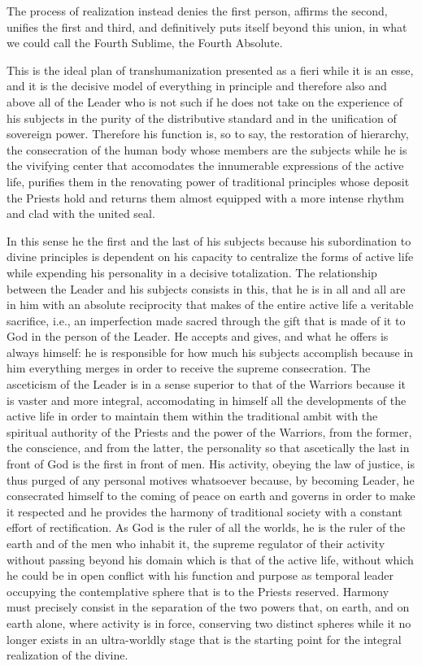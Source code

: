 The process of realization instead denies the first person, affirms the second, unifies the first and third, and definitively puts itself beyond this union, in what we could call the Fourth Sublime, the Fourth Absolute.

This is the ideal plan of transhumanization presented as a fieri while it is an esse, and it is the decisive model of everything in principle and therefore also and above all of the Leader who is not such if he does not take on the experience of his subjects in the purity of the distributive standard and in the unification of sovereign power. Therefore his function is, so to say, the restoration of hierarchy, the consecration of the human body whose members are the subjects while he is the vivifying center that accomodates the innumerable expressions of the active life, purifies them in the renovating power of traditional principles whose deposit the Priests hold and returns them almost equipped with a more intense rhythm and clad with the united seal.

In this sense he the first and the last of his subjects because his subordination to divine principles is dependent on his capacity to centralize the forms of active life while expending his personality in a decisive totalization. The relationship between the Leader and his subjects consists in this, that he is in all and all are in him with an absolute reciprocity that makes of the entire active life a veritable sacrifice, i.e., an imperfection made sacred through the gift that is made of it to God in the person of the Leader. He accepts and gives, and what he offers is always himself: he is responsible for how much his subjects accomplish because in him everything merges in order to receive the supreme consecration. The asceticism of the Leader is in a sense superior to that of the Warriors because it is vaster and more integral, accomodating in himself all the developments of the active life in order to maintain them within the traditional ambit with the spiritual authority of the Priests and the power of the Warriors, from the former, the conscience, and from the latter, the personality so that ascetically the last in front of God is the first in front of men. His activity, obeying the law of justice, is thus purged of any personal motives whatsoever because, by becoming Leader, he consecrated himself to the coming of peace on earth and governs in order to make it respected and he provides the harmony of traditional society with a constant effort of rectification. As God is the ruler of all the worlds, he is the ruler of the earth and of the men who inhabit it, the supreme regulator of their activity without passing beyond his domain which is that of the active life, without which he could be in open conflict with his function and purpose as temporal leader occupying the contemplative sphere that is to the Priests reserved. Harmony must precisely consist in the separation of the two powers that, on earth, and on earth alone, where activity is in force, conserving two distinct spheres while it no longer exists in an ultra-worldly stage that is the starting point for the integral realization of the divine.

